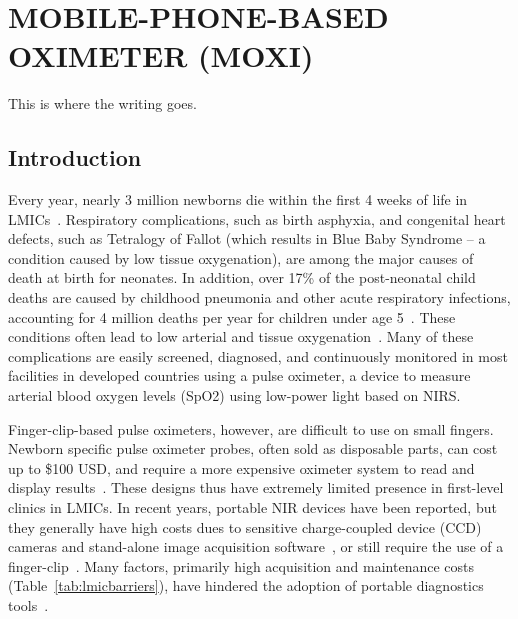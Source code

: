 
\chapter{MOBILE-PHONE-BASED OXIMETER (MOXI)} %
\label{chap:moxi}
This is where the writing goes. 


\section{Introduction} %
\label{chap:moxi:introduction}
Every year, nearly 3 million newborns die within the first 4 weeks of life in \ac{LMIC}s~\cite{Worldhealthorganization2006}. Respiratory complications, such as birth asphyxia, and congenital heart defects, such as Tetralogy of Fallot (which results in Blue Baby Syndrome – a condition caused by low tissue oxygenation), are among the major causes of death at birth for neonates. In addition, over 17\% of the post-neonatal child deaths are caused by childhood pneumonia and other acute respiratory infections, accounting for 4 million deaths per year for children under age 5~\cite{Alexander2018}. These conditions often lead to low arterial and tissue oxygenation~\cite{Weber2003}. Many of these complications are easily screened, diagnosed, and continuously monitored in most facilities in developed countries using a pulse oximeter, a device to measure arterial blood oxygen levels (SpO2) using low-power light based on NIRS. 

Finger-clip-based pulse oximeters, however, are difficult to use on small fingers. Newborn specific pulse oximeter probes, often sold as disposable parts, can cost up to \$100 USD, and require a more expensive oximeter system to read and display results~\cite{Ouro-BangnaMaman2005,Heywood1989}. These designs thus have extremely limited presence in first-level clinics in LMICs. In recent years, portable NIR devices have been reported, but they generally have high costs dues to sensitive charge-coupled device (CCD) cameras and stand-alone image acquisition software~\cite{Jung2013}, or still require the use of a finger-clip~\cite{Karlen2011,Hudson2012}. Many factors, primarily high acquisition and maintenance costs (Table~\ref{tab:lmicbarriers}), have hindered the adoption of portable diagnostics tools~\cite{Malkin2007}. 

